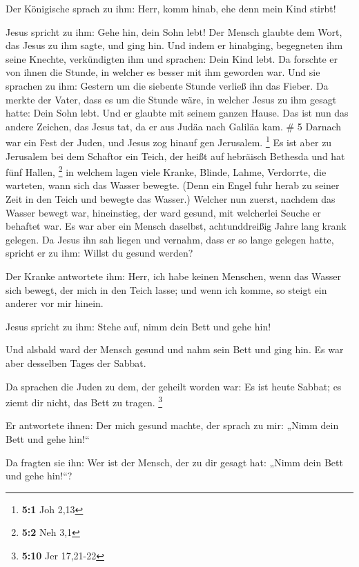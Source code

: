  Der Königische sprach zu ihm: Herr, komm hinab, ehe denn
mein Kind stirbt!

 Jesus spricht zu ihm: Gehe hin, dein Sohn lebt! Der
Mensch glaubte dem Wort, das Jesus zu ihm sagte, und ging hin.
 Und indem er hinabging, begegneten ihm seine Knechte,
verkündigten ihm und sprachen: Dein Kind lebt.  Da
forschte er von ihnen die Stunde, in welcher es besser mit ihm geworden
war. Und sie sprachen zu ihm: Gestern um die siebente Stunde verließ ihn
das Fieber.  Da merkte der Vater, dass es um die Stunde
wäre, in welcher Jesus zu ihm gesagt hatte: Dein Sohn lebt. Und er
glaubte mit seinem ganzen Hause.  Das ist nun das andere
Zeichen, das Jesus tat, da er aus Judäa nach Galiläa kam. \# 5
 Darnach war ein Fest der Juden, und Jesus zog hinauf gen
Jerusalem. \footnote{\textbf{5:1} Joh 2,13}  Es ist aber
zu Jerusalem bei dem Schaftor ein Teich, der heißt auf hebräisch
Bethesda und hat fünf Hallen, \footnote{\textbf{5:2} Neh 3,1}
 in welchem lagen viele Kranke, Blinde, Lahme, Verdorrte,
die warteten, wann sich das Wasser bewegte.  (Denn ein
Engel fuhr herab zu seiner Zeit in den Teich und bewegte das Wasser.)
Welcher nun zuerst, nachdem das Wasser bewegt war, hineinstieg, der ward
gesund, mit welcherlei Seuche er behaftet war.  Es war
aber ein Mensch daselbst, achtunddreißig Jahre lang krank gelegen.
 Da Jesus ihn sah liegen und vernahm, dass er so lange
gelegen hatte, spricht er zu ihm: Willst du gesund werden?

 Der Kranke antwortete ihm: Herr, ich habe keinen
Menschen, wenn das Wasser sich bewegt, der mich in den Teich lasse; und
wenn ich komme, so steigt ein anderer vor mir hinein.

 Jesus spricht zu ihm: Stehe auf, nimm dein Bett und gehe
hin!

 Und alsbald ward der Mensch gesund und nahm sein Bett und
ging hin. Es war aber desselben Tages der Sabbat.

 Da sprachen die Juden zu dem, der geheilt worden war: Es
ist heute Sabbat; es ziemt dir nicht, das Bett zu tragen. \footnote{\textbf{5:10}
  Jer 17,21-22}

 Er antwortete ihnen: Der mich gesund machte, der sprach
zu mir: „Nimm dein Bett und gehe hin!{}``

 Da fragten sie ihn: Wer ist der Mensch, der zu dir
gesagt hat: „Nimm dein Bett und gehe hin!{}``?

